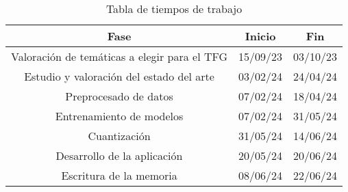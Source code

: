 \begin{table}[H]
	\centering
	\begin{tabular}{|c|c|c|}
		\hline
		\textbf{Fase} & \textbf{Inicio} & \textbf{Fin} \\ \hline
		Valoración de temáticas a elegir para el TFG & 15/09/23 & 03/10/23 \\ \hline
		Estudio y valoración del estado del arte & 03/02/24 & 24/04/24 \\ \hline
		Preprocesado de datos & 07/02/24 & 18/04/24 \\ \hline
		Entrenamiento de modelos & 07/02/24 & 31/05/24 \\ \hline
		Cuantización & 31/05/24 & 14/06/24 \\ \hline
		Desarrollo de la aplicación & 20/05/24 & 20/06/24 \\ \hline
		Escritura de la memoria & 08/06/24 & 22/06/24 \\ \hline
	\end{tabular}
	\caption{Tabla de tiempos de trabajo}
	\label{tab:planif}
\end{table}
